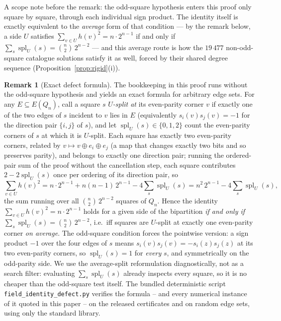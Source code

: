 \documentclass[12pt,a4paper]{article}
\theoremstyle{definition}
\newtheorem{remark}[theorem]{Remark}
\begin{document}
A scope note before the remark: the odd-square hypothesis enters this
proof only square by square, through each individual sign product. The
identity itself is exactly equivalent to the \emph{average} form of that
condition --- by the remark below, a side $U$ satisfies
$\sum_{v\in U}h(v)^2=n\cdot2^{n-1}$ if and only if
$\sum_s\operatorname{spl}_U(s)=\binom n2\,2^{n-2}$ --- and this average
route is how the $19\,477$ non-odd-square catalogue solutions satisfy it
as well, forced by their shared degree sequence
(Proposition~\ref{prop:rigid}(i)).

\begin{remark}[Exact defect formula]\label{rem:defect}
The bookkeeping in this proof runs without the odd-square hypothesis and
yields an exact formula for arbitrary edge sets. For any $E\subseteq
E(Q_n)$, call a square $s$ \emph{$U$-split at} its even-parity corner $v$
if exactly one of the two edges of $s$ incident to $v$ lies in $E$
(equivalently $s_i(v)s_j(v)=-1$ for the direction pair $\{i,j\}$ of $s$),
and let $\operatorname{spl}_U(s)\in\{0,1,2\}$ count the even-parity
corners of $s$ at which it is $U$-split. Each square has exactly two
even-parity corners, related by $v\mapsto v\oplus e_i\oplus e_j$ (a map
that changes exactly two bits and so preserves parity), and
belongs to exactly one direction pair; running the ordered-pair sum of the
proof without the cancellation step, each square contributes
$2-2\operatorname{spl}_U(s)$ once per ordering of its direction pair, so
\[
\sum_{v\in U}h(v)^2
= n\cdot2^{n-1} + n(n-1)\,2^{n-1} - 4\sum_{s}\operatorname{spl}_U(s)
= n^2\,2^{n-1} - 4\sum_{s}\operatorname{spl}_U(s),
\]
the sum running over all $\binom n2\,2^{n-2}$ squares of $Q_n$. Hence the
identity $\sum_{v\in U}h(v)^2=n\cdot2^{n-1}$ holds for a given side of
the bipartition \emph{if and only if}
$\sum_s\operatorname{spl}_U(s)=\binom n2\,2^{n-2}$, i.e.\ iff squares
are $U$-split at exactly one even-parity corner \emph{on average}. The
odd-square condition forces the pointwise version: a sign product $-1$
over the four edges of $s$ means $s_i(v)s_j(v)=-s_i(z)s_j(z)$ at its two
even-parity corners, so $\operatorname{spl}_U(s)=1$ for \emph{every}
$s$, and symmetrically on the odd-parity side. We use the average-split
reformulation diagnostically, not as a search filter: evaluating
$\sum_s\operatorname{spl}_U(s)$ already inspects every square, so it is
no cheaper than the odd-square test itself. The bundled deterministic
script \texttt{field\_identity\_defect.py} verifies the formula -- and
every numerical instance of it quoted in this paper -- on the released
certificates and on random edge sets, using only the standard library.
\end{remark}
\end{document}
